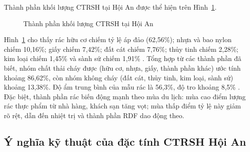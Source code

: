 \documentclass[../main.tex]{subfiles}
\begin{document}
Thành phần khối lượng CTRSH tại Hội An được thể hiện trên Hình~\ref{fig:thanh-phan-rac-hoi-an}.

\begin{figure}[H]
    \centering
    \makeatletter
    \def\pgfpie@legend#1{%
      \coordinate[xshift=0.8cm,
      yshift={(\the\pgfpie@sliceLength*0.5+1)*0.8cm}] (pgfpie@legendpos) at
      (current bounding box.east);
    
      \scope[node distance=0.8cm]
        \foreach \pgfpie@p/\pgfpie@t [count=\pgfpie@i from 0] in {#1}
        {
          \pgfpie@findColor{\pgfpie@i}
          \node[draw, fill={\pgfpie@thecolor}, \pgfpie@style, below of={pgfpie@legendpos}, label={0:{\pgfpie@t}}] (pgfpie@legendpos) {};
        }
      \endscope
    }
    \makeatother
\caption{Thành phần khối lượng CTRSH tại Hội An}
\label{fig:thanh-phan-rac-hoi-an}
\end{figure}

Hình~\ref{fig:thanh-phan-rac-hoi-an} cho thấy rác hữu cơ chiếm tỷ lệ áp đảo (62,56\%); nhựa và bao nylon chiếm 10,16\%; giấy chiếm 7,42\%; đất cát chiếm 7,76\%; thủy tinh chiếm 2,28\%; kim loại chiếm 1,45\% và sành sứ chiếm 1,91\% \cite{BaocaoHoiAn2024}. Tổng hợp từ các thành phần đã biết, nhóm chất thải cháy được (hữu cơ, nhựa, giấy, thành phần khác) ước tính khoảng 86,62\%, còn nhóm không cháy (đất cát, thủy tinh, kim loại, sành sứ) khoảng 13,38\%. Độ ẩm trung bình của mẫu rác là 56,3\%, độ tro khoảng 8,5\% \cite{BaocaoHoiAn2024}. Đặc biệt, thành phần rác biến động mạnh theo mùa du lịch: mùa cao điểm lượng rác thực phẩm từ nhà hàng, khách sạn tăng vọt; mùa thấp điểm tỷ lệ này giảm rõ rệt, dẫn đến nhiệt trị và thành phần RDF dao động theo.

\subsection{Ý nghĩa kỹ thuật của đặc tính CTRSH Hội An}
\label{sec:y-nghia-ky-thuat}
\end{document}

